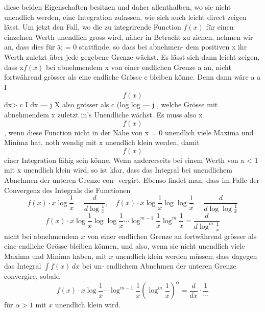 \documentclass[12pt,a4paper]{book}
\theoremstyle{definition}
\theoremstyle{remark}
\begin{document}
{{{{%
diese  beiden  Eigenschaften  besitzen  und  daher  allenthalben,  wo  sie
nicht  unendlich  werden,  eine  Integration  zulassen,  wie  sich  auch  leicht
direct  zeigen  lässt.
Um  jetzt  den  Fall,  wo  die  zu  integrirende  Function  $f(x)$  für  einen
einzelnen  Werth  unendlich  gross  wird,  näher  in  Betracht  zu  ziehen,
nehmen  wir  an,  dass  dies  für  ä;  =  0  stattfinde,  so  dass  bei  abnehmen-
dem positiven  x  ihr  Werth  zuletzt  über  jede  gegebene  Grenze  wächst.
Es  lässt  sich  dann  leicht  zeigen,  dass  x$f(x)$  bei  abnehmendem  x
von  einer  endlichen  Grenze  a  an,  nicht  fortwährend  grösser  als  eine
endliche  Grösse  c  bleiben  könne.     Denn  dann  wäre
a  a
I
$$f(x)$$  dx>  c  I
dx
---  j
X
also  grösser  als  c  (log   log  --- j ,  welche  Grösse  mit  abnehmendem
x  zuletzt  in's  Unendliche  wächst.  Es  muss  also  x$$f(x)$$,  wenn  diese
Function  nicht  in  der  Nähe  von  x  =  0  unendlich  viele  Maxima  und
Minima  hat,  noth wendig  mit  x  unendlich  klein  werden,  damit  $$f(x)$$
einer  Integration  fähig  sein  könne.     Wenn  andererseits
bei  einem  Werth  von  a  <  1  mit  x  unendlich  klein  wird,  so  ist  klar,
dass  das  Integral  bei  unendlichem  Abnehmen  der  unteren  Grenze  con-
vergirt.
Ebenso  findet  man,  dass  im  Falle  der  Convergenz  des  Integrals
die  Functionen
\[ f(x) \cdot x \log \frac{1}{x} = \frac{d}{d\log\frac{1}{x}}, \quad f(x) \cdot x \log\frac{1}{x} \log\log\frac{1}{x} = \frac{d}{d\log\log\frac{1}{x}} \]
\[ f(x) \cdot x \log\frac{1}{x} \log\log\frac{1}{x} \cdots \log^{m-1}\frac{1}{x} \log^m\frac{1}{x} = \frac{d}{d\log^m\frac{1}{x}} \]
nicht  bei  abnehmendem  $x$  von  einer  endlichen  Grenze  an  fortwährend
grösser  als  eine  endliche  Grösse  bleiben  können,  und  also,  wenn  sie
nicht  unendlich  viele  Maxima  und  Minima  haben,  mit  $x$  unendlich
klein  werden  müssen;  dass  dagegen  das  Integral  $\int f(x)\, dx$  bei  un-
endlichem Abnehmen  der  unteren  Grenze  convergire,  sobald
\[ f(x) \cdot x \log\frac{1}{x} \cdots \log^{m-1}\frac{1}{x} \left(\log^m\frac{1}{x}\right)^\alpha = \frac{d}{dx} \cdot \frac{1}{\cdots} \]
für  $\alpha > 1$  mit  $x$  unendlich  klein  wird.
\newpage

}}}}
\end{document}
